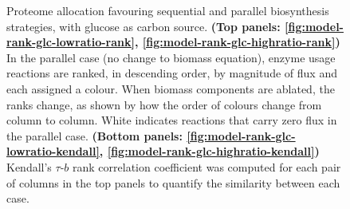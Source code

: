 \begin{figure}
  \caption{
    Proteome allocation favouring sequential and parallel biosynthesis strategies, with glucose as carbon source.
    \textbf{(Top panels: \ref{fig:model-rank-glc-lowratio-rank}, \ref{fig:model-rank-glc-highratio-rank})} In the parallel case (no change to biomass equation), enzyme usage reactions are ranked, in descending order, by magnitude of flux and each assigned a colour.
    When biomass components are ablated, the ranks change, as shown by how the order of colours change from column to column.
    White indicates reactions that carry zero flux in the parallel case.
    \textbf{(Bottom panels: \ref{fig:model-rank-glc-lowratio-kendall}, \ref{fig:model-rank-glc-highratio-kendall})} Kendall's $\tau$-$b$ rank correlation coefficient was computed for each pair of columns in the top panels to quantify the similarity between each case.
  }
  \label{fig:model-rank-glc}
\end{figure}

